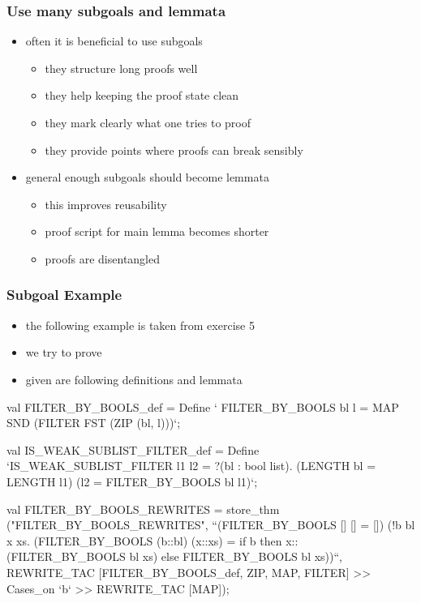 \begin{frame}[fragile]
\frametitle{Use many subgoals and lemmata}

\begin{itemize}
\item often it is beneficial to use subgoals
\begin{itemize}
\item they structure long proofs well
\item they help keeping the proof state clean
\item they mark clearly what one tries to proof 
\item they provide points where proofs can break sensibly
\end{itemize}
\item general enough subgoals should become lemmata
\begin{itemize}
\item this improves reusability
\item proof script for main lemma becomes shorter
\item proofs are disentangled 
\end{itemize}
\end{itemize}
\end{frame}


\begin{frame}[fragile]
\frametitle{Subgoal Example}

\begin{itemize}
\item the following example is taken from exercise 5
\item we try to prove 
\item given are following definitions and lemmata
\end{itemize}

\begin{block}{}
\begin{semiverbatim}\scriptsize
val FILTER_BY_BOOLS_def = Define `
  FILTER_BY_BOOLS bl l = MAP SND (FILTER FST (ZIP (bl, l)))`;

val IS_WEAK_SUBLIST_FILTER_def = Define `IS_WEAK_SUBLIST_FILTER l1 l2 =
  ?(bl : bool list). (LENGTH bl = LENGTH l1) \holAnd{} (l2 = FILTER_BY_BOOLS bl l1)`;

val FILTER_BY_BOOLS_REWRITES = store_thm ("FILTER_BY_BOOLS_REWRITES",
  ``(FILTER_BY_BOOLS [] [] = []) \holAnd{}
    (!b bl x xs. (FILTER_BY_BOOLS (b::bl) (x::xs) =
     if b then x::(FILTER_BY_BOOLS bl xs) else FILTER_BY_BOOLS bl xs))``,
REWRITE_TAC [FILTER_BY_BOOLS_def, ZIP, MAP, FILTER] >>
Cases_on `b` >> REWRITE_TAC [MAP]);
\end{semiverbatim}
\end{block}

\end{frame}


